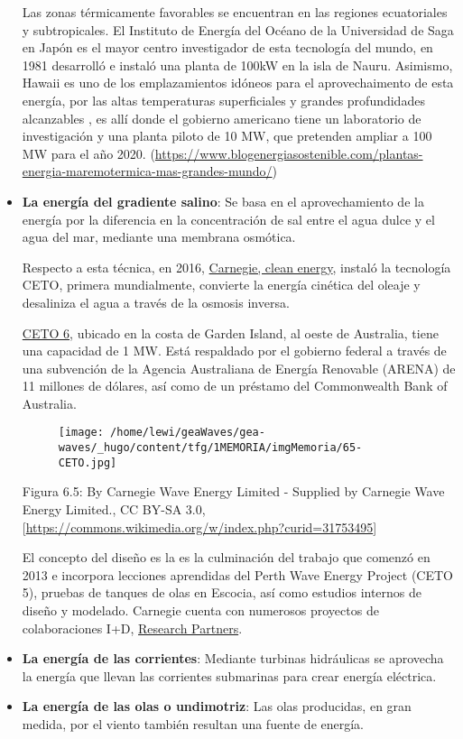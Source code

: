 \documentclass[]{article}
\begin{document}
\begin{itemize}
  Las zonas térmicamente favorables se encuentran en las regiones
  ecuatoriales y subtropicales. El Instituto de Energía del Océano de la
  Universidad de Saga en Japón es el mayor centro investigador de esta
  tecnología del mundo, en 1981 desarrolló e instaló una planta de 100kW
  en la isla de Nauru. Asimismo, Hawaii es uno de los emplazamientos
  idóneos para el aprovechaimento de esta energía, por las altas
  temperaturas superficiales y grandes profundidades alcanzables , es
  allí donde el gobierno americano tiene un laboratorio de investigación
  y una planta piloto de 10 MW, que pretenden ampliar a 100 MW para el
  año 2020.
  (\url{https://www.blogenergiasostenible.com/plantas-energia-maremotermica-mas-grandes-mundo/})
\item
  \textbf{La energía del gradiente salino}: Se basa en el
  aprovechamiento de la energía por la diferencia en la concentración de
  sal entre el agua dulce y el agua del mar, mediante una membrana
  osmótica.

  Respecto a esta técnica, en 2016,
  \href{https://www.carnegiece.com/wave/}{Carnegie, clean energy},
  instaló la tecnología CETO, primera mundialmente, convierte la energía
  cinética del oleaje y desaliniza el agua a través de la osmosis
  inversa.

  \href{https://www.carnegiece.com/project/ceto-6-garden-island/}{CETO
  6}, ubicado en la costa de Garden Island, al oeste de Australia, tiene
  una capacidad de 1 MW. Está respaldado por el gobierno federal a
  través de una subvención de la Agencia Australiana de Energía
  Renovable (ARENA) de 11 millones de dólares, así como de un préstamo
  del Commonwealth Bank of Australia.

  \begin{figure}
  \centering
  \texttt{[image: /home/lewi/geaWaves/gea-waves/\_hugo/content/tfg/1MEMORIA/imgMemoria/65-CETO.jpg]}
  \caption{}
  \end{figure}

  Figura 6.5: By Carnegie Wave Energy Limited - Supplied by Carnegie
  Wave Energy Limited., CC BY-SA 3.0,
  {[}\url{https://commons.wikimedia.org/w/index.php?curid=31753495}{]}

  El concepto del diseño es la es la culminación del trabajo que comenzó
  en 2013 e incorpora lecciones aprendidas del Perth Wave Energy Project
  (CETO 5), pruebas de tanques de olas en Escocia, así como estudios
  internos de diseño y modelado. Carnegie cuenta con numerosos proyectos
  de colaboraciones I+D,
  \href{https://www.carnegiece.com/partner/research-partners/}{Research
  Partners}.
\item
  \textbf{La energía de las corrientes}: Mediante turbinas hidráulicas
  se aprovecha la energía que llevan las corrientes submarinas para
  crear energía eléctrica.
\item
  \textbf{La energía de las olas o undimotriz}: Las olas producidas, en
  gran medida, por el viento también resultan una fuente de energía. 
\end{itemize}
\end{document}
